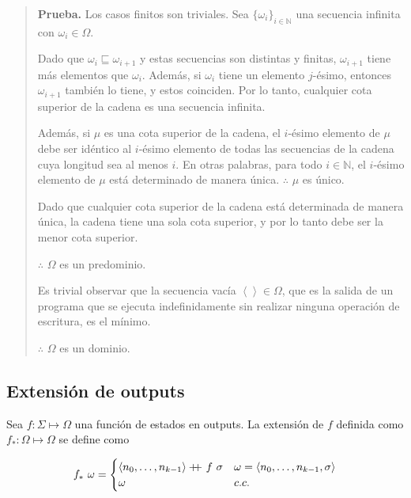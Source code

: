 \documentclass[a4paper, 12pt]{article}
\newcommand\doubleplus{+\kern-1.3ex+\kern0.8ex}
\begin{document}
\small
\begin{quote}

\textbf{Prueba.} Los casos finitos son triviales. Sea $\{ \omega_i \}_{i \in \mathbb{N}}$ una secuencia infinita con $\omega_i \in \Omega$.

Dado que $\omega_i \sqsubseteq \omega_{i+1}$ y estas secuencias son distintas y finitas, $\omega_{i+1}$ tiene más elementos que $\omega_i$. Además, si $\omega_i$ tiene un elemento $j$-ésimo, entonces $\omega_{i+1}$ también lo tiene, y estos coinciden. Por lo tanto, cualquier cota superior de la cadena es una secuencia infinita.

Además, si $\mu$ es una cota superior de la cadena, el $i$-ésimo elemento de $\mu$ debe ser idéntico al $i$-ésimo elemento de todas las secuencias de la cadena cuya longitud sea al menos $i$. En otras palabras, para todo $i \in \mathbb{N}$, el $i$-ésimo elemento de $\mu$ está determinado de manera única. $\therefore$ $\mu$ es único.

Dado que cualquier cota superior de la cadena está determinada de manera única, la cadena tiene una sola cota superior, y por lo tanto debe ser la menor cota superior.

$\therefore$ $\Omega$ es un predominio.

Es trivial observar que la secuencia vacía $\left< \right> \in \Omega$, que es la salida de un programa que se ejecuta indefinidamente sin realizar ninguna operación de escritura, es el mínimo.

$\therefore$ $\Omega$ es un dominio.

\end{quote}
\normalsize

\pagebreak 
\subsection{Extensión de outputs}

Sea $f : \Sigma \mapsto \Omega$ una función de estados en outputs. La extensión
de $f$ definida como $f_* : \Omega \mapsto \Omega$ se define como

\begin{equation*}
  f_* ~ \omega = \begin{cases}
    \left<n_0, \ldots, n_{k-1} \right> \doubleplus f ~ \sigma & \omega =
    \left<n_0, \ldots, n_{k-1}, \sigma \right> \\ 
    \omega & c.c.
  \end{cases}
\end{equation*}
\end{document}
